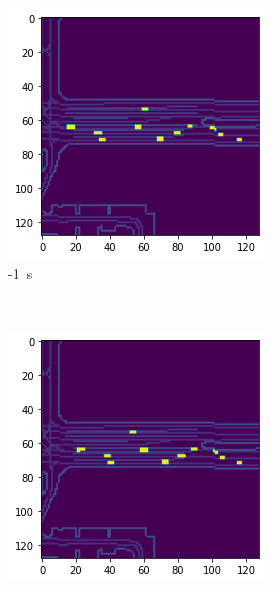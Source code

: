 \documentclass[12pt]{article}
\begin{document}
        \begin{figure}[H]
            \centering
            \begin{subfigure}[b]{0.18\textwidth}
                \includegraphics[width=\textwidth]{output_static_brake_0.png}
                \caption{-1~s}
            \end{subfigure}
            ~
            \begin{subfigure}[b]{0.18\textwidth}
                \includegraphics[width=\textwidth]{output_static_brake_1.png}

\end{subfigure}
\end{figure}
\end{document}
